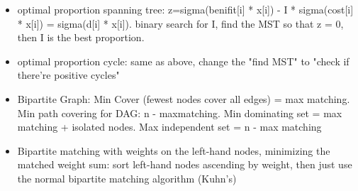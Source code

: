 \begin{itemize}
\item optimal proportion spanning tree: z=sigma(benifit[i] * x[i]) - I * sigma(cost[i] * x[i]) = sigma(d[i] * x[i]). binary search for I, find the MST so that z = 0, then I is the best proportion.
\item optimal proportion cycle: same as above, change the "find MST" to "check if there're positive cycles"
\item Bipartite Graph: Min Cover (fewest nodes cover all edges) = max matching. Min path covering for DAG: n - maxmatching. Min dominating set = max matching + isolated nodes. Max independent set = n - max matching
\item Bipartite matching with weights on the left-hand nodes, minimizing the matched weight sum:
      sort left-hand nodes ascending by weight, then just use the normal bipartite matching algorithm (Kuhn's)
\end{itemize}
